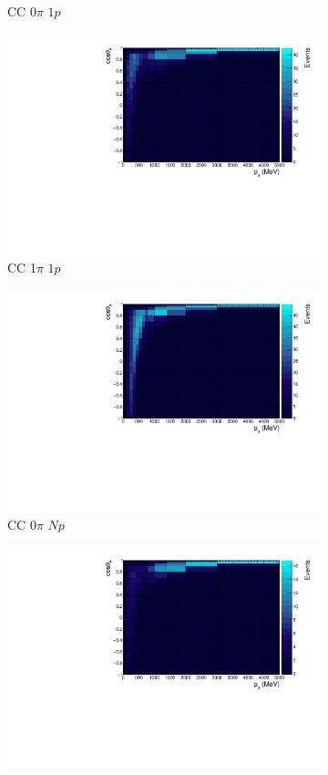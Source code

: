 \begin{figure}
\begin{subfigure}{.49\textwidth}
  \caption{CC 0$\pi$ $1p$}
\end{subfigure}
\begin{subfigure}{.49\textwidth}
  \centering
  \includegraphics[width=0.9\linewidth]{figs/hptpc_pmtmuu_cc1pi1p.pdf}
  \caption{CC 1$\pi$ $1p$}
\end{subfigure}
\begin{subfigure}{.49\textwidth}
  \centering
  \includegraphics[width=0.9\linewidth]{figs/hptpc_pmtmuu_cc0piNp.pdf}
  \caption{CC 0$\pi$ $Np$}
\end{subfigure}
\begin{subfigure}{.49\textwidth}
  \centering
  \includegraphics[width=0.9\linewidth]{figs/hptpc_pmtmuu_cc1piNp.pdf}

\end{subfigure}
\end{figure}
